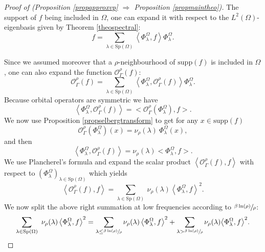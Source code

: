 \documentclass[10pt]{amsart}
\let\mathcal\mathscr
\theoremstyle{plain}
\theoremstyle{definition}
\newcommand{\supp}[1]{\mathrm{supp}(#1)}
\newcommand{\somme}[1]{\sum_{#1}}
\begin{document}
\begin{proof}[Proof of (Proposition \ref{propapproxvp}
$\Rightarrow$ Proposition \ref{propmaintheo})]
The support of $f$ being included in $\Omega$, one can expand it with respect to the $L^2(\Omega)$-eigenbasis given by Theorem \ref{theospectral}:
\[
f = \somme{\lambda \in \mathrm{Sp}(\Omega)} \left<\Phi^{\Omega}_{\lambda},f \right> \Phi^{\Omega}_{\lambda}.
\]

Since we assumed moreover that a $\rho$-neighbourhood of $\supp{f}$ is included in $\Omega$, one can also expand the function $\mathcal{O}^{\rho}_{\Gamma}(f)$:
\begin{equation*}
\mathcal{O}^{\rho}_{\Gamma}(f) = \somme{\lambda \in \mathrm{Sp}(\Omega)} \left<\Phi^{\Omega}_{\lambda}, \mathcal{O}^{\rho}_{\Gamma}(f) \right> \Phi^{\Omega}_{\lambda}.
\end{equation*}
Because orbital operators are symmetric we have
\[
\left<\Phi^{\Omega}_{\lambda}, \mathcal{O}^{\rho}_{\Gamma}(f) \right> = \bigl< \mathcal{O}^{\rho}_{\Gamma}(\Phi^{\Omega}_{\lambda}), f \bigr>.
\]
We now use Proposition \ref{propselbergtransform} to get for any $x \in \text{supp}(f)$
\[
\mathcal{O}_{\Gamma}^{\rho} \left(\Phi^{\Omega}_{\lambda} \right)(x) = \nu_{\rho}(\lambda) \ \Phi^{\Omega}_{\lambda}(x),
\]
and then
\[
\left<\Phi^{\Omega}_{\lambda}, \mathcal{O}^{\rho}_{\Gamma}(f) \right> = \nu_{\rho}(\lambda) \bigl< \Phi^{\Omega}_{\lambda}, f \bigr>.
\]
We use Plancherel's formula and expand the scalar product
$\left< \mathcal{O}_{\Gamma}^{\rho}(f),f \right>$ with respect to $(\Phi^{\Omega}_{\lambda})_{\lambda \in \text{Sp}(\Omega)}$ which yields
\[
\left< \mathcal{O}_{\Gamma}^{\rho}(f),f \right> = \somme{\lambda \in \mathrm{Sp}(\Omega)} \ \nu_{\rho}(\lambda) \left<\Phi^{\Omega}_{\lambda},f \right>^2.
\]
We now split the above right summation at low frequencies according to $\sfrac{\beta \ln (\rho)} {\rho}$:
\begin{equation}
\label{equation13}
\somme{\lambda \in \mathrm{Sp}(\Omega)} \ \nu_{\rho}(\lambda) \left<\Phi^{\Omega}_{\lambda},f \right>^2 = \somme{ \lambda \le \sfrac{\beta \ln (\rho)} {\rho}} \nu_{\rho}(\lambda) \left<\Phi^{\Omega}_{\lambda},f \right>^2 + \somme{ \lambda > \sfrac{\beta \ln (\rho)} {\rho}} \nu_{\rho}(\lambda) \bigl<\Phi^{\Omega}_{\lambda},f \bigr>^2.
\end{equation}


\end{proof}
\end{document}
